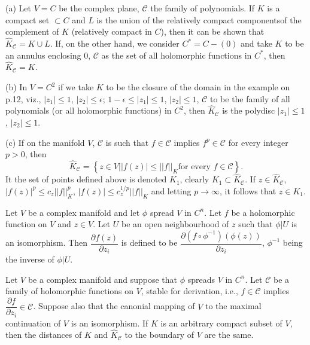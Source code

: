 \begin{examples*}
(a) Let $V = C$ be the complex plane, $\mathscr{C}$ the family of
  polynomials. If $K$ is a compact set $\subset C$ and $L$ is the
  union of the relatively compact components\pageoriginale of the
  complement of $K$ (relatively compact in $C$), then it can be shown
  that $\hat{K}_\mathscr{C} = K \cup L$. If, on the other hand, we
  consider $C^\ast = C - (0)$ and take $K$ to be an annulus enclosing
  $0$, $\mathscr{C}$ as the set of all holomorphic functions in
  $C^\ast$, then $\hat{K}_\mathscr{C} = K$. 

(b) In $V = C^2$ if we take $K$ to be the closure of the domain in the
  example on p.12, viz., $|z_1| \leq 1$, $|z_2| \leq \epsilon$; $1-\epsilon \leq
  |z_1| \leq 1$, $|z_2|\leq 1$, $\mathscr{C}$ to be the family of all
  polynomials (or all holomorphic functions) in $C^2$, then
  $\hat{K}_\mathscr{C}$ is the polydisc $|z_1|\leq 1$, $|z_2| \leq 1$.

(c) If on the manifold $V$, $\mathscr{C}$ is such that $f \in
  \mathscr{C}$ implies $f^p \in\mathscr{C}$ for every integer $p >0$,
  then 
$$
\hat{K}_\mathscr{C} = \left\{z \in V \big| |f(z) | \leq ||f||_K \text{
for every } f \in \mathscr{C} \right\}.
$$
It the set of points defined above is denoted $K_1$, clearly $K_1
\subset \hat{K}_\mathscr{C}$. If $z \in \hat{K}_\mathscr{C}$,
$|f(z)|^p \leq c_z ||f||^p_K$, $|f(z)| \leq c_z^{1/p} ||f||_K$ and
letting $p\to \infty$, it follows that $z \in K_1$.

Let $V$ be a complex manifold and let $\phi$ spread $V$ in $C^n$. Let
$f$ be a holomorphic function on $V$ and $z \in V$. Let $U$ be an open
neighbourhood of $z$ such that $\phi|U$ is an isomorphism. Then
$\dfrac{\partial f(z)}{\partial z_i}$ is defined to be
$\dfrac{\partial (f \circ \phi^{-1})(\phi(z))}{\partial z_i}$,
$\phi^{-1}$ being the inverse of $\phi|U$.
\end{examples*}

\setcounter{thm}{0}
\begin{thm}\label{chap6:thm1}
Let $V$ be a complex manifold and suppose that $\phi$ spreads $V$ in
$C^n$. Let $\mathscr{C}$ be a family of holomorphic functions on $V$,
stable for derivation, i.e., $f \in \mathscr{C}$ implies
$\dfrac{\partial f}{\partial z_i} \in \mathscr{C}$. Suppose also that
the canonial mapping of $V$ to the maximal continuation of $V$ is an
isomorphism. If $K$ is an arbitrary compact subset of $V$, then the
distances of $K$ and $\hat{K}_{\mathscr{C}}$ to the boundary of $V$
are the same. 
\end{thm}


